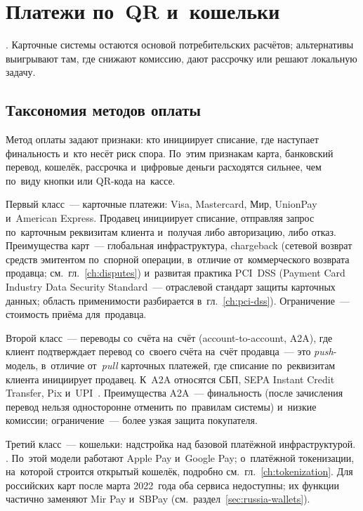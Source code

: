 
\chapter{Платежи по~QR и~кошельки}\label{ch:qr-wallets}
.
Карточные системы остаются основой потребительских расчётов; альтернативы
выигрывают там, где снижают комиссию, дают рассрочку или решают локальную
задачу.

\section{Таксономия методов оплаты}\label{sec:payment-methods-taxonomy}

Метод оплаты задают признаки: кто инициирует списание, где наступает
финальность и~кто несёт риск спора. По~этим признакам карта, банковский
перевод, кошелёк, рассрочка и~цифровые деньги расходятся сильнее, чем по~виду
кнопки или QR-кода на~кассе.

Первый класс~--- карточные платежи: Visa, Mastercard, Мир, UnionPay и~American
Express. Продавец инициирует списание, отправляя запрос по~карточным реквизитам
клиента и~получая либо авторизацию, либо отказ. Преимущества карт~---
глобальная инфраструктура, chargeback (сетевой возврат
  средств эмитентом по~спорной операции, в~отличие от~коммерческого возврата
продавца; см.~гл.~\ref{ch:disputes}) и~развитая практика PCI~DSS (Payment Card
  Industry Data Security Standard~--- отраслевой стандарт защиты карточных данных;
область применимости разбирается в~гл.~\ref{ch:pci-dss}). Ограничение~--- стоимость
приёма для~продавца.

Второй класс~--- переводы со~счёта на~счёт (account-to-account, A2A), где
клиент подтверждает перевод со~своего счёта на~счёт продавца~--- это
\textit{push}-модель, в~отличие от~\textit{pull} карточных платежей, где
списание по~реквизитам клиента инициирует продавец. К~A2A относятся СБП, SEPA Instant Credit
Transfer, Pix и~UPI~\cite{sbp-main,sepa-instant,pix,upi}. Преимущества A2A~---
финальность (после зачисления перевод нельзя односторонне отменить
по~правилам системы) и~низкие комиссии; ограничение~--- более узкая защита
покупателя.

Третий класс~--- кошельки: надстройка над базовой платёжной инфраструктурой.
. По~этой модели работают Apple Pay и~Google Pay;
о~платёжной токенизации, на~которой строится открытый кошелёк, подробно
см.~гл.~\ref{ch:tokenization}. Для российских карт после марта 2022~года оба
сервиса недоступны; их функции частично заменяют Mir Pay и~SBPay
(см.~раздел~\ref{sec:russia-wallets}).

